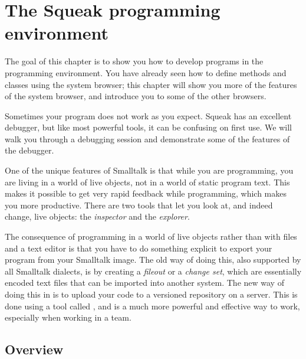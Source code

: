 \documentclass[a4paper,10pt,twoside]{book}
\begin{document}
	\renewcommand{\nnbb}[2]{} %
\fi
\chapter{The Squeak programming environment}
\label{cha:env}

The goal of this chapter is to show you how to develop programs in the \Squeak programming environment.
You have already seen how to define methods and classes using the system browser; this chapter will show you more of the features of the system browser, and introduce you to some of the other browsers.

Sometimes your program does not work as you expect.
Squeak has an excellent debugger, but like most powerful tools, it can be confusing on first use.
We will walk you through a debugging session and demonstrate some of the features of the debugger.

One of the unique features of Smalltalk is that while you are programming, you are living in a world of live objects, not in a world of static program text.
This makes it possible to get very rapid feedback while programming, which makes you more productive.
There are two tools that let you look at, and indeed change, live objects: the \emph{inspector} and the \emph{explorer}.

The consequence of programming in a world of live objects rather than with files and a text editor is that you have to do something explicit to export your program from your Smalltalk image.
The old way of doing this, also supported by all Smalltalk dialects, is by creating a \emph{fileout} or a \emph{change set}, which are essentially encoded text files that can be imported into another system.
The new way of doing this in \Squeak is to upload your code to a versioned repository on a server.
This is done using a tool called , and is a much more powerful and effective way to work, especially when working in a team.


\section{Overview}
\label{sec:overview}
\end{document}
